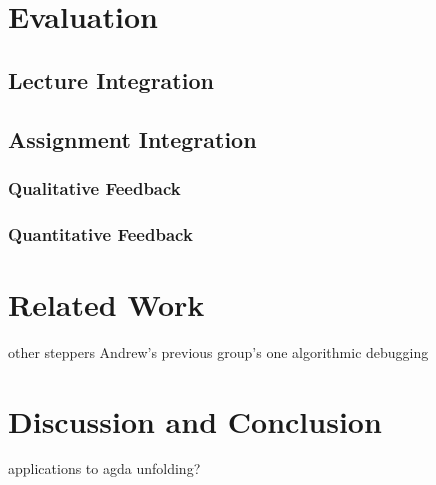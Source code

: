 \section{Evaluation}

\subsection{Lecture Integration}

\subsection{Assignment Integration}
\subsubsection{Qualitative Feedback}
\subsubsection{Quantitative Feedback}

\section{Related Work}
other steppers
Andrew's previous group's one
algorithmic debugging

\section{Discussion and Conclusion}

applications to agda unfolding?





\endinput

